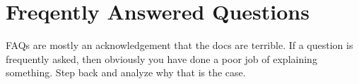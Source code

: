 \chapter{Freqently Answered Questions}

FAQs are mostly an acknowledgement that the docs are terrible. If a
question is frequently asked, then obviously you have done a poor job of
explaining something. Step back and analyze why that is the case.

